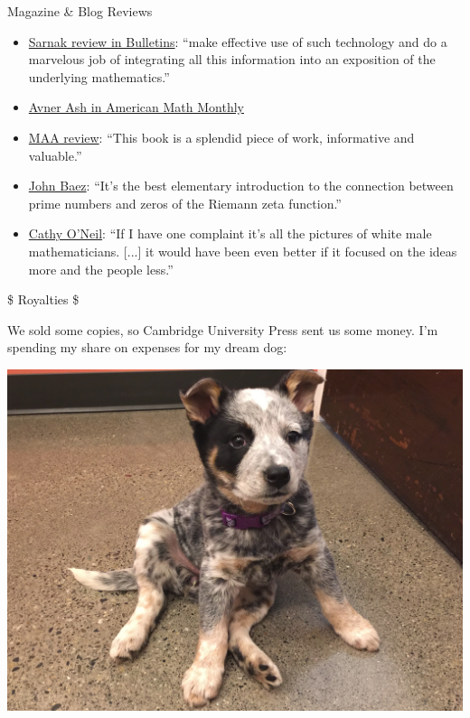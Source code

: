 \documentclass{beamer}
\begin{document}
\begin{frame}{Magazine \& Blog Reviews}
  \begin{itemize}
    \item \href{http://www.ams.org/journals/bull/2018-55-03/S0273-0979-2018-01624-8/}{Sarnak review in Bulletins}: ``make effective use of such technology and do a marvelous job of integrating
all this information into an exposition of the underlying mathematics.''
    \item \href{https://www.tandfonline.com/doi/abs/10.1080/00029890.2018.1438005}{Avner Ash in American Math Monthly}
    \item \href{https://www.maa.org/press/maa-reviews/prime-numbers-and-the-riemann-hypothesis}{MAA review}: ``This book is a splendid piece of work, informative and valuable.''
    \item \href{https://golem.ph.utexas.edu/category/2016/03/prime_numbers_and_the_riemann.html}{John Baez}: ``It's the best elementary introduction to the connection between prime numbers and zeros of the Riemann zeta function.''
    \item \href{https://mathbabe.org/2016/05/03/prime-numbers-and-the-riemann-hypothesis/}{Cathy O'Neil}: ``If I have one complaint it's all the pictures of white male mathematicians. [...] it would have been even better if it focused on the ideas more and the people less.''
  \end{itemize}
\end{frame}

\begin{frame}{\$ Royalties \$}

  We sold some copies, so Cambridge University Press sent us some money.
  I'm spending my share on expenses for my dream dog:

  \begin{center}
    \includegraphics[height=.7\textheight]{pics/bella-puppy}
  \end{center}


\end{frame}
\end{document}
